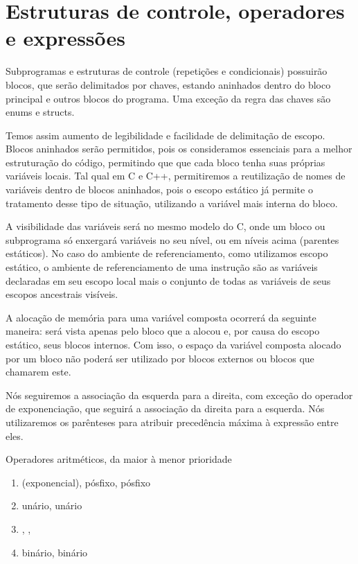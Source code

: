 \section{Estruturas de controle, operadores e expressões}

Subprogramas e estruturas de controle (repetições e condicionais) possuirão
blocos, que serão delimitados por chaves, estando aninhados dentro do bloco
principal e outros blocos do programa. Uma exceção da regra das chaves são
enums e structs.

Temos assim aumento de legibilidade e facilidade de delimitação de escopo.
Blocos aninhados serão permitidos, pois os consideramos essenciais para a
melhor estruturação do código, permitindo que que cada bloco tenha suas
próprias variáveis locais. Tal qual em C e C++, permitiremos a reutilização de
nomes de variáveis dentro de blocos aninhados, pois o escopo estático já
permite o tratamento desse tipo de situação, utilizando a variável mais interna
do bloco.

A visibilidade das variáveis será no mesmo modelo do C, onde um bloco ou
subprograma só enxergará variáveis no seu nível, ou em níveis acima (parentes
estáticos). No caso do ambiente de referenciamento, como utilizamos escopo
estático, o ambiente de referenciamento de uma instrução são as variáveis
declaradas em seu escopo local mais o conjunto de todas as variáveis de seus
escopos ancestrais visíveis.

A alocação de memória para uma variável composta ocorrerá da seguinte maneira:
será vista apenas pelo bloco que a alocou e, por causa do escopo estático, seus
blocos internos. Com isso, o espaço da variável composta alocado por um bloco
não poderá ser utilizado por blocos externos ou blocos que chamarem este.

Nós seguiremos a associação da esquerda para a direita, com exceção do operador
de exponenciação, que seguirá a associação da direita para a esquerda. Nós
utilizaremos os parênteses para atribuir precedência máxima à expressão entre
eles.

Operadores aritméticos, da maior à menor prioridade
\begin{enumerate}
    \item
    \ic{^} (exponencial), \ic{++} pósfixo,  \ic{--} pósfixo
    \item
    \ic{+} unário, \ic{-} unário
    \item
    \ic{*}, \ic{/},  \ic{\%}
    \item
    \ic{+} binário, \ic{-} binário
\end{enumerate}

